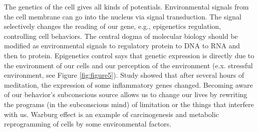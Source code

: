 \documentclass[12pt, a4paper]{article}
\begin{document}
The genetics of the cell gives all kinds of potentials. %
Environmental signals from the cell membrane can go into the nucleus via signal transduction. The signal selectively changes the reading of our gene, e.g., epigenetics regulation, controlling cell behaviors.%
The central dogma of molecular biology should be modified as environmental signals to regulatory protein to DNA to RNA and then to protein.
Epigenetics control says that genetic expression is directly due to the environment of our cells and our perception of the environment\cite{Gustafson2017} (e.x. stressful environment, see Figure \ref{fig:figure5}).
Study showed that after several hours of meditation, the expression of some inflammatory genes changed\cite{Gustafson2017}.
Becoming aware of our behavior's subconscious source allows us to change our lives by rewriting the programs (in the subconscious mind) of limitation or the things that interfere with us.
Warburg effect\cite{Warburg1956}\cite{Chang2017b} is an example of carcinogenesis and metabolic reprogramming of cells by some environmental factors.
\end{document}
